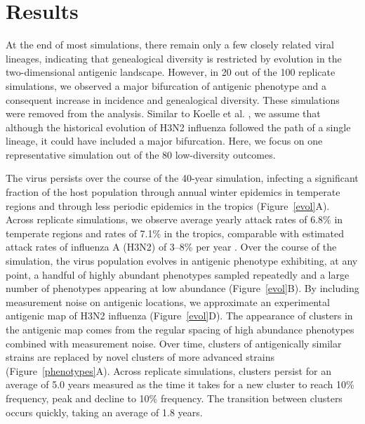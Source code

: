 \documentclass[11pt,oneside,letterpaper]{article}
\begin{document}
\section*{Results}


At the end of most simulations, there remain only a few closely related viral lineages, indicating that genealogical diversity is restricted by evolution in the two-dimensional antigenic landscape.  However, in 20 out of the 100 replicate simulations, we observed a major bifurcation of antigenic phenotype and a consequent increase in incidence and genealogical diversity.  These simulations were removed from the analysis.   Similar to Koelle et al. \cite{Koelle11}, we assume that although the historical evolution of H3N2 influenza followed the path of a single lineage, it could have included a major bifurcation.  Here, we focus on one representative simulation out of the 80 low-diversity outcomes.

The virus persists over the course of the 40-year simulation, infecting a significant fraction of the host population through annual winter epidemics in temperate regions and through less periodic epidemics in the tropics (Figure~\ref{evol}A).  Across replicate simulations, we observe average yearly attack rates of 6.8\% in temperate regions and rates of 7.1\% in the tropics, comparable with estimated attack rates of influenza A (H3N2) of 3--8\% per year \cite{Monto93,Koelle09}.  Over the course of the simulation, the virus population evolves in antigenic phenotype exhibiting, at any point, a handful of highly abundant phenotypes sampled repeatedly and a large number of phenotypes appearing at low abundance (Figure~\ref{evol}B).  By including measurement noise on antigenic locations, we approximate an experimental antigenic map of H3N2 influenza (Figure~\ref{evol}D).  The appearance of clusters in the antigenic map comes from the regular spacing of high abundance phenotypes combined with measurement noise.  Over time, clusters of antigenically similar strains are replaced by novel clusters of more advanced strains (Figure~\ref{phenotypes}A).  Across replicate simulations, clusters persist for an average of 5.0 years measured as the time it takes for a new cluster to reach 10\% frequency, peak and decline to 10\% frequency.  The transition between clusters occurs quickly, taking an average of 1.8 years.
\end{document}
